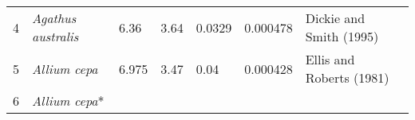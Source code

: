 \documentclass[]{article}
\begin{document}
\begin{longtable}[]{@{}lllllll@{}}
\begin{minipage}[t]{0.05\columnwidth}
4\strut
\end{minipage} & \begin{minipage}[t]{0.23\columnwidth}\raggedright
\emph{Agathus australis}\strut
\end{minipage} & \begin{minipage}[t]{0.05\columnwidth}\raggedright
6.36\strut
\end{minipage} & \begin{minipage}[t]{0.08\columnwidth}\raggedright
3.64\strut
\end{minipage} & \begin{minipage}[t]{0.08\columnwidth}\raggedright
0.0329\strut
\end{minipage} & \begin{minipage}[t]{0.08\columnwidth}\raggedright
0.000478\strut
\end{minipage} & \begin{minipage}[t]{0.23\columnwidth}\raggedright
Dickie and Smith (1995)\strut
\end{minipage}\tabularnewline
\begin{minipage}[t]{0.05\columnwidth}\raggedright
5\strut
\end{minipage} & \begin{minipage}[t]{0.23\columnwidth}\raggedright
\emph{Allium cepa}\strut
\end{minipage} & \begin{minipage}[t]{0.05\columnwidth}\raggedright
6.975\strut
\end{minipage} & \begin{minipage}[t]{0.08\columnwidth}\raggedright
3.47\strut
\end{minipage} & \begin{minipage}[t]{0.08\columnwidth}\raggedright
0.04\strut
\end{minipage} & \begin{minipage}[t]{0.08\columnwidth}\raggedright
0.000428\strut
\end{minipage} & \begin{minipage}[t]{0.23\columnwidth}\raggedright
Ellis and Roberts (1981)\strut
\end{minipage}\tabularnewline
\begin{minipage}[t]{0.05\columnwidth}\raggedright
6\strut
\end{minipage} & \begin{minipage}[t]{0.23\columnwidth}\raggedright
\emph{Allium cepa}*\strut
\end{minipage} & \begin{minipage}[t]{0.05\columnwidth}\raggedright

\end{minipage}
\end{longtable}
\end{document}

